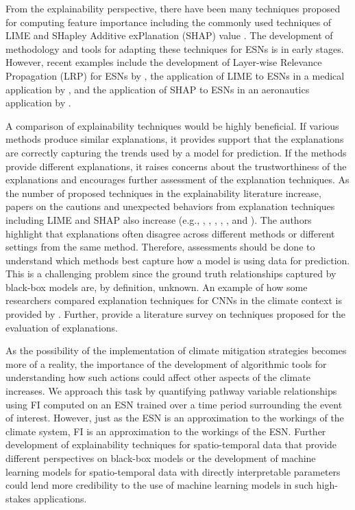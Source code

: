 \documentclass[AMS,STIX2COL]{WileyNJD-v2}
\begin{document}
From the explainability perspective, there have been many techniques proposed for computing feature importance including the commonly used techniques of LIME \citep{ribeiro2016} and SHapley Additive exPlanation (SHAP) value \citep{lundberg2017}. The development of methodology and tools for adapting these techniques for ESNs is in early stages. However, recent examples include the development of Layer-wise Relevance Propagation (LRP) for ESNs by \citet{landt2022}, the application of LIME to ESNs in a medical application by \citet{bouazizi2023}, and the application of SHAP to ESNs in an aeronautics application by \citet{baptista2022}. 

A comparison of explainability techniques would be highly beneficial. If various methods produce similar explanations, it provides support that the explanations are correctly capturing the trends used by a model for prediction. If the methods provide different explanations, it raises concerns about the trustworthiness of the explanations and encourages further assessment of the explanation techniques. As the number of proposed techniques in the explainability literature increase, papers on the cautions and unexpected behaviors from explanation techniques including LIME and SHAP also increase (e.g., \citep{alvarezmelis2018}, \citep{goode2021}, \citep{kumar2020}, \citep{molnar2022}, \citep{krishna2022}, and \citep{roy2022}). The authors highlight that explanations often disagree across different methods or different settings from the same method. Therefore, assessments should be done to understand which methods best capture how a model is using data for prediction. This is a challenging problem since the ground truth relationships captured by black-box models are, by definition, unknown. An example of how some researchers compared explanation techniques for CNNs in the climate context is provided by \citet{mamalakis2022investigating}. Further, \cite{vilone2021} provide a literature survey on techniques proposed for the evaluation of explanations.

As the possibility of the implementation of climate mitigation strategies becomes more of a reality, the importance of the development of algorithmic tools for understanding how such actions could affect other aspects of the climate increases. We approach this task by quantifying pathway variable relationships using FI computed on an ESN trained over a time period surrounding the event of interest. However, just as the ESN is an approximation to the workings of the climate system, FI is an approximation to the workings of the ESN. Further development of explainability techniques for spatio-temporal data that provide different perspectives on black-box models or the development of machine learning models for spatio-temporal data with directly interpretable parameters could lend more credibility to the use of machine learning models in such high-stakes applications.
\end{document}
